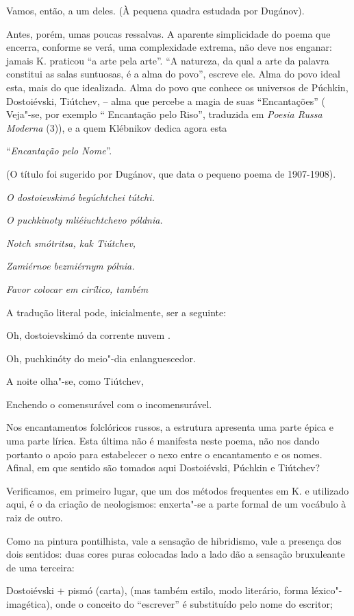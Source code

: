 Vamos, então, a um deles. (À pequena quadra estudada por Dugánov).

Antes, porém, umas poucas ressalvas. A aparente simplicidade do poema
que encerra, conforme se verá, uma complexidade extrema, não deve nos
enganar: jamais K. praticou ``a arte pela arte''. ``A natureza, da qual
a arte da palavra constitui as salas suntuosas, é a alma do povo'',
escreve ele. Alma do povo ideal esta, mais do que idealizada. Alma do
povo que conhece os universos de Púchkin, Dostoiévski, Tiútchev, -- alma
que percebe a magia de suas ``Encantações'' ( Veja"-se, por exemplo ``
Encantação pelo Riso'', traduzida em \emph{Poesia Russa Moderna} (3)), e
a quem Klébnikov dedica agora esta

``\emph{Encantação pelo Nome}''.

(O título foi sugerido por Dugánov, que data o pequeno poema de
1907-1908).

\emph{O dostoievskimó begúchtchei tútchi.}

\emph{O puchkinoty mliéiuchtchevo póldnia.}

\emph{Notch smótritsa, kak Tiútchev,}

\emph{Zamiérnoe bezmiérnym pólnia.}

\emph{Favor colocar em cirílico, também}

A tradução literal pode, inicialmente, ser a seguinte:

Oh, dostoievskimó da corrente nuvem .

Oh, puchkinóty do meio"-dia enlanguescedor.

A noite olha"-se, como Tiútchev,

Enchendo o comensurável com o incomensurável.

Nos encantamentos folclóricos russos, a estrutura apresenta uma parte
épica e uma parte lírica. Esta última não é manifesta neste poema, não
nos dando portanto o apoio para estabelecer o nexo entre o encantamento
e os nomes. Afinal, em que sentido são tomados aqui Dostoiévski, Púchkin
e Tiútchev?

Verificamos, em primeiro lugar, que um dos métodos frequentes em K. e
utilizado aqui, é o da criação de neologismos: enxerta"-se a parte formal
de um vocábulo à raiz de outro.

Como na pintura pontilhista, vale a sensação de hibridismo, vale a
presença dos dois sentidos: duas cores puras colocadas lado a lado dão a
sensação bruxuleante de uma terceira:

Dostoiévski + pismó (carta), (mas também estilo, modo literário, forma
léxico"-imagética), onde o conceito do ``escrever'' é substituído pelo
nome do escritor;

